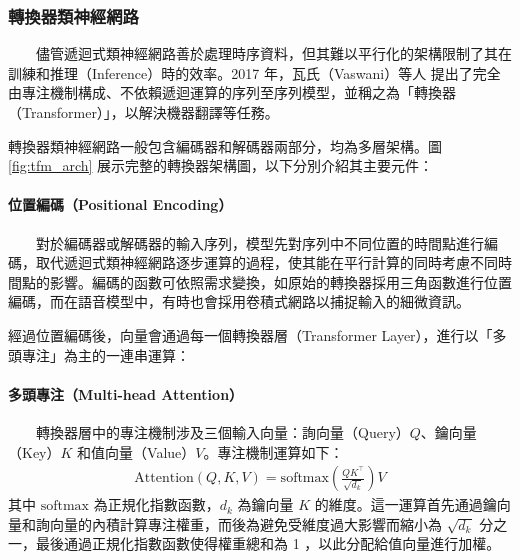 \subsubsection{轉換器類神經網路}

　　儘管遞迴式類神經網路善於處理時序資料，但其難以平行化的架構限制了其在訓練和推理（Inference）時的效率。2017 年，瓦氏（Vaswani）等人 \cite{vaswani2017attention} 提出了完全由專注機制構成、不依賴遞迴運算的序列至序列模型，並稱之為「轉換器（Transformer）」，以解決機器翻譯等任務。

        轉換器類神經網路一般包含編碼器和解碼器兩部分，均為多層架構。圖 \ref{fig:tfm_arch} 展示完整的轉換器架構圖，以下分別介紹其主要元件：

\paragraph{位置編碼（Positional Encoding）} \hfill \break
%
　　對於編碼器或解碼器的輸入序列，模型先對序列中不同位置的時間點進行編碼，取代遞迴式類神經網路逐步運算的過程，使其能在平行計算的同時考慮不同時間點的影響。編碼的函數可依照需求變換，如原始的轉換器採用三角函數進行位置編碼，而在語音模型中，有時也會採用卷積式網路以捕捉輸入的細微資訊。

        經過位置編碼後，向量會通過每一個轉換器層（Transformer Layer），進行以「多頭專注」為主的一連串運算：

\paragraph{多頭專注（Multi-head Attention）} \hfill \break
%
　　轉換器層中的專注機制涉及三個輸入向量：詢向量（Query）$Q$、鑰向量（Key）$K$ 和值向量（Value）$V$。專注機制運算如下：
\begin{align}
    \text{Attention}(Q, K, V) = \text{softmax}
    \left(
    \frac{QK^\top}{\sqrt{d_k}}
    \right)
    V
                \label{eq:attn}
\end{align}
其中 $\text{softmax}$ 為正規化指數函數，$d_k$ 為鑰向量 $K$ 的維度。這一運算首先通過鑰向量和詢向量的內積計算專注權重，而後為避免受維度過大影響而縮小為 $\sqrt{d_k}$ 分之一，最後通過正規化指數函數使得權重總和為 1 ，以此分配給值向量進行加權。

